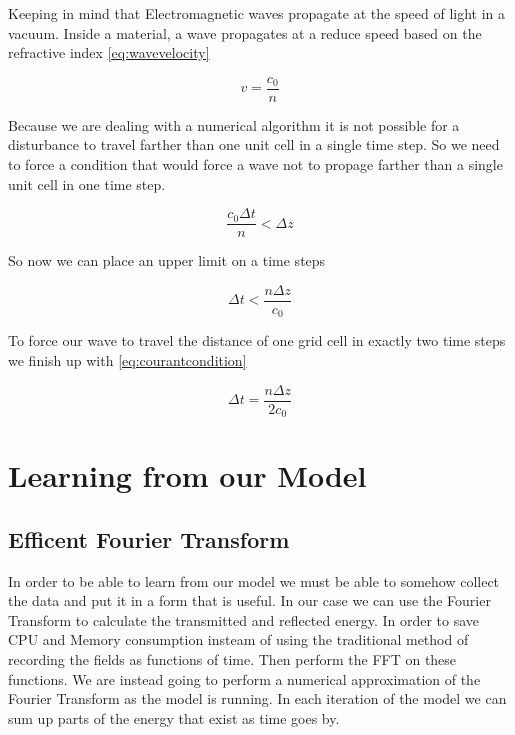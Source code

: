 \documentclass[a4paper,10pt]{article}
\begin{document}
Keeping in mind that Electromagnetic waves propagate at the speed of light in a vacuum.  Inside a material, a wave propagates at a reduce speed based on the refractive index \eqref{eq:wavevelocity}

\begin{equation}
 \label{eq:wavevelocity}
 v = \frac{c_0}{n}
\end{equation}

Because we are dealing with a numerical algorithm it is not possible for a disturbance to travel farther than one unit cell in a single time step.  So we need to force a condition that would force a wave not to propage farther than a single unit cell in one time step.

\begin{equation*}
 \frac{c_0 \Delta t}{n} < \Delta z
\end{equation*}

So now we can place an upper limit on a time steps

\begin{equation*}
 \Delta t < \frac{n \Delta z}{c_0}
\end{equation*}

To force our wave to travel the distance of one grid cell in exactly two time steps we finish up with \eqref{eq:courantcondition}

\begin{equation}
 \label{eq:courantcondition}
 \Delta t = \frac{n \Delta z}{2c_0}
\end{equation}


\section{Learning from our Model}

\subsection{Efficent Fourier Transform}

In order to be able to learn from our model we must be able to somehow collect the data and put it in a form that is useful.  In our case we can use the Fourier Transform to calculate the transmitted and reflected energy.  In order to save CPU and Memory consumption insteam of using the traditional method of recording the fields as functions of time.  Then perform the FFT on these functions.  We are instead going to perform a numerical approximation of the Fourier Transform as the model is running.  In each iteration of the model we can sum up parts of the energy that exist as time goes by.  
\end{document}
